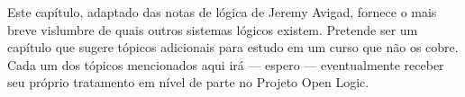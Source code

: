 \documentclass[../../../include/open-logic-chapter]{subfiles}
\begin{document}

\begin{editorial}Este capítulo, adaptado das notas de lógica de Jeremy Avigad,
  fornece o mais breve vislumbre de quais outros sistemas lógicos existem.
  Pretende ser um capítulo que sugere tópicos adicionais para estudo em um
  curso que não os cobre.  Cada um dos tópicos mencionados
  aqui irá --- espero --- eventualmente receber seu próprio tratamento em
  nível de parte no Projeto Open Logic.\end{editorial}








\OLEndChapterHook
\end{document}
